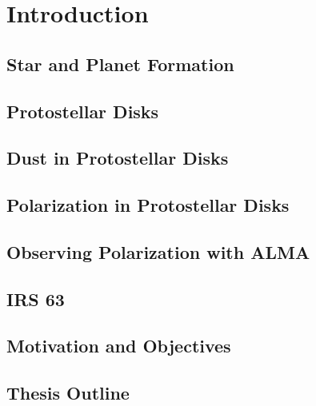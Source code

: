 \chapter{Introduction}
\label{ch_introduction}



\section{Star and Planet Formation}




\section{Protostellar Disks}



\section{Dust in Protostellar Disks}



\section{Polarization in Protostellar Disks}



\section{Observing Polarization with ALMA} 



\section{IRS 63}




\section{Motivation and Objectives}




\section{Thesis Outline}









